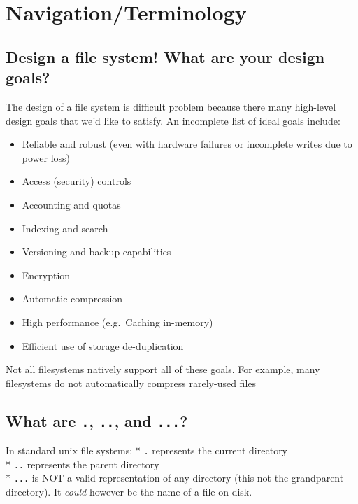 \section{Navigation/Terminology}\label{navigationterminology}

\subsection{Design a file system! What are your design
goals?}\label{design-a-file-system-what-are-your-design-goals}

The design of a file system is difficult problem because there many
high-level design goals that we'd like to satisfy. An incomplete list of
ideal goals include:

\begin{itemize}
\tightlist
\item
  Reliable and robust (even with hardware failures or incomplete writes
  due to power loss)
\item
  Access (security) controls
\item
  Accounting and quotas
\item
  Indexing and search
\item
  Versioning and backup capabilities
\item
  Encryption
\item
  Automatic compression
\item
  High performance (e.g.~Caching in-memory)
\item
  Efficient use of storage de-duplication
\end{itemize}

Not all filesystems natively support all of these goals. For example,
many filesystems do not automatically compress rarely-used files

\subsection{\texorpdfstring{What are \texttt{.}, \texttt{..}, and
\texttt{...}?}{What are ., .., and ...?}}\label{what-are-.-..-and-...}

In standard unix file systems: * \texttt{.} represents the current
directory\\
* \texttt{..} represents the parent directory\\
* \texttt{...} is NOT a valid representation of any directory (this not
the grandparent directory). It \emph{could} however be the name of a
file on disk.

